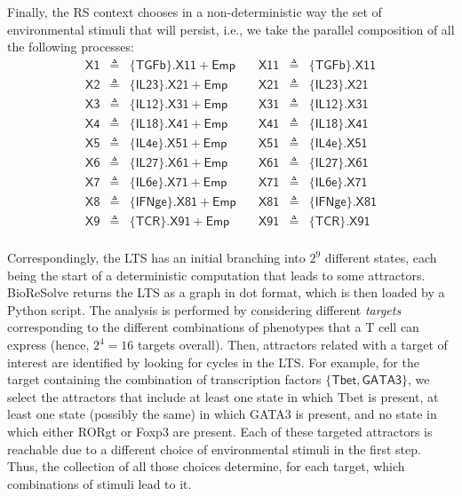 Finally, the RS context chooses in a non-deterministic way the set of environmental stimuli that will persist, i.e., we take the parallel composition of all the following processes:
\[
\begin{array}{rllrll}
\mathsf{X1} & \triangleq & \{\mathsf{TGFb}\}.\mathsf{X11} + \mathsf{Emp} &\quad
\mathsf{X11} & \triangleq & \{\mathsf{TGFb}\}.\mathsf{X11}\\
\mathsf{X2} & \triangleq & \{\mathsf{IL23}\}.\mathsf{X21} + \mathsf{Emp} &\quad
\mathsf{X21} & \triangleq & \{\mathsf{IL23}\}.\mathsf{X21}\\
\mathsf{X3} & \triangleq & \{\mathsf{IL12}\}.\mathsf{X31} + \mathsf{Emp} &\quad
\mathsf{X31} & \triangleq & \{\mathsf{IL12}\}.\mathsf{X31}\\
\mathsf{X4} & \triangleq & \{\mathsf{IL18}\}.\mathsf{X41} + \mathsf{Emp} &\quad
\mathsf{X41} & \triangleq & \{\mathsf{IL18}\}.\mathsf{X41}\\
\mathsf{X5} & \triangleq & \{\mathsf{IL4e}\}.\mathsf{X51} + \mathsf{Emp} &\quad
\mathsf{X51} & \triangleq & \{\mathsf{IL4e}\}.\mathsf{X51}\\
\mathsf{X6} & \triangleq & \{\mathsf{IL27}\}.\mathsf{X61} + \mathsf{Emp} &\quad
\mathsf{X61} & \triangleq & \{\mathsf{IL27}\}.\mathsf{X61}\\
\mathsf{X7} & \triangleq & \{\mathsf{IL6e}\}.\mathsf{X71} + \mathsf{Emp} &\quad
\mathsf{X71} & \triangleq & \{\mathsf{IL6e}\}.\mathsf{X71}\\
\mathsf{X8} & \triangleq & \{\mathsf{IFNge}\}.\mathsf{X81} + \mathsf{Emp} &\quad
\mathsf{X81} & \triangleq & \{\mathsf{IFNge}\}.\mathsf{X81}\\
\mathsf{X9} & \triangleq & \{\mathsf{TCR}\}.\mathsf{X91} + \mathsf{Emp} &\quad
\mathsf{X91} & \triangleq & \{\mathsf{TCR}\}.\mathsf{X91}\\
\end{array}
\]

Correspondingly, the LTS has an initial branching into $2^9$ different states, each being the start of a deterministic computation that leads to some attractors. 
BioReSolve returns the LTS as a graph in dot format, which is then loaded by a Python script. The analysis is performed by considering different \emph{targets} corresponding to the different combinations of phenotypes that a T cell can express (hence, $2^4=16$ targets overall).
Then, attractors related with a target of interest are identified by looking for cycles in the LTS. 
For example, for the target containing the combination of transcription factors $\{\mathsf{Tbet},\mathsf{GATA3}\}$, we select the attractors that include at least one state in which Tbet is present, at least one state (possibly the same) in which GATA3 is present, and no state in which either RORgt or Foxp3 are present.
Each of these targeted attractors is reachable due to a different choice of environmental stimuli in the first step. Thus, the collection of all those choices determine, for each target, which combinations of stimuli lead to it. 

